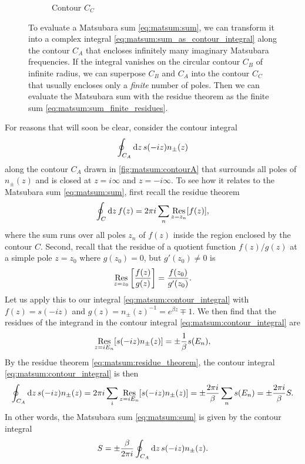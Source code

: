 \begin{figure}
\begin{subfigure}{0.32\textwidth}
\begin{tikzpicture}
\end{tikzpicture}
\caption{\label{fig:matsum:contourC}Contour $C_C$}
\end{subfigure}
\caption{\label{fig:matsum:contours}%
	To evaluate a Matsubara sum \eqref{eq:matsum:sum}, we can transform it into a complex integral \eqref{eq:matsum:sum_as_contour_integral} along the contour $C_A$ that encloses infinitely many imaginary Matsubara frequencies.
	If the integral vanishes on the circular contour $C_B$ of infinite radius, we can superpose $C_B$ and $C_A$ into the contour $C_C$ that usually encloses only a \emph{finite} number of poles.
	Then we can evaluate the Matsubara sum with the residue theorem as the finite sum \eqref{eq:matsum:sum_finite_residues}.
}
\end{figure}

For reasons that will soon be clear, consider the contour integral
\begin{equation}
	\oint_{C_A} \dif z \, s(-iz) n_\pm(z)
\label{eq:matsum:contour_integral}
\end{equation}
along the contour $C_A$ drawn in \cref{fig:matsum:contourA} that surrounds all poles of $n_\pm(z)$ and is closed at $z = i \infty$ and $z = -i \infty$.
To see how it relates to the Matsubara sum \eqref{eq:matsum:sum}, first recall the residue theorem
\begin{equation}
	\oint_C \dif z \, f(z) = 2 \pi i \sum_n \res_{z=z_n} [f(z)] ,
\label{eq:matsum:residue_theorem}
\end{equation}
where the sum runs over all poles $z_n$ of $f(z)$ inside the region enclosed by the contour $C$.
Second, recall that the residue of a quotient function $f(z) / g(z)$ at a simple pole $z = z_0$ where $g(z_0) = 0$, but $g'(z_0) \neq 0$ is 
\begin{equation}
	\res_{z=z_0} \left[ \frac{f(z)}{g(z)} \right] = \frac{f(z_0)}{g'(z_0)} .
\label{eq:matsum:residue_quotient}
\end{equation}
Let us apply this to our integral \eqref{eq:matsum:contour_integral} with $f(z) = s(-iz)$ and $g(z) = n_\pm(z)^{-1} = e^{\beta z} \mp 1$.
We then find that the residues of the integrand in the contour integral \eqref{eq:matsum:contour_integral} are
\begin{equation}
	\res_{z = i E_n} [s(-iz) n_\pm(z)] = \pm \frac{1}{\beta} s(E_n) ,
\end{equation}
By the residue theorem \eqref{eq:matsum:residue_theorem}, the contour integral \eqref{eq:matsum:contour_integral} is then
\begin{equation}
	\oint_{C_A} \dif z \, s(-iz) n_\pm(z) = 2 \pi i \sum_i \res_{z = i E_n}[s(-i z) n_\pm(z)]
	                                  = \pm \frac{2 \pi i}{\beta} \sum_n s(E_n)
									  = \pm \frac{2 \pi i}{\beta} S .
\label{eq:matsum:connection_integral_sum}
\end{equation}
In other words, the Matsubara sum \eqref{eq:matsum:sum} is given by the contour integral
\begin{equation}
	S = \pm \frac{\beta}{2 \pi i} \oint_{C_A} \dif z \, s(-iz) n_\pm(z) .
\label{eq:matsum:sum_as_contour_integral}
\end{equation}

